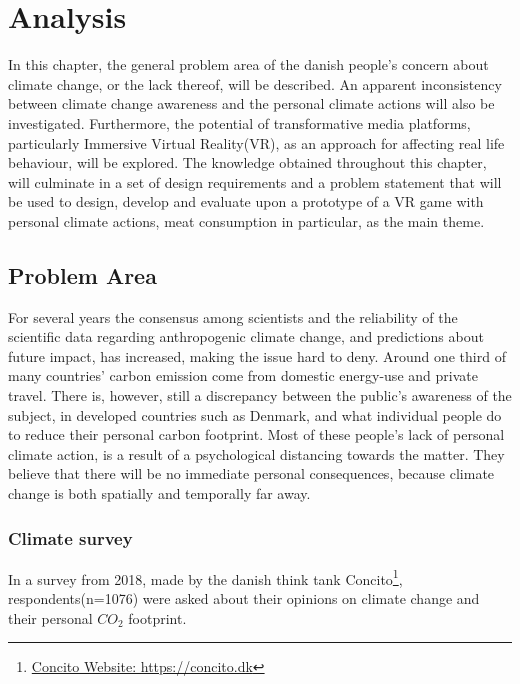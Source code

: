 \chapter{Analysis}\label{chap:analysis}
    In this chapter, the general problem area of the danish people's concern about climate change, or the lack thereof, will be described. An apparent inconsistency between climate change awareness and the personal climate actions will also be investigated. Furthermore, the potential of transformative media platforms, particularly Immersive Virtual Reality(VR), as an approach for affecting real life behaviour, will be explored. The knowledge obtained throughout this chapter, will culminate in a set of design requirements and a problem statement that will be used to design, develop and evaluate upon a prototype of a VR game with personal climate actions, meat consumption in particular, as the main theme.

\section{Problem Area}\label{sec:problemArea}
    For several years the consensus among scientists and the reliability of the scientific data regarding anthropogenic climate change, and predictions about future impact, has increased, making the issue hard to deny\cite{the5Ds, scientistConsensus, publicEngagementUnderstanding}. Around one third of many countries' carbon emission come from domestic energy-use and private travel\cite{reorientingClimageChangeCommunication}. There is, however, still a discrepancy between the public's awareness of the subject, in developed countries such as Denmark, and what individual people do to reduce their personal carbon footprint. Most of these people's lack of personal climate action, is a result of a psychological distancing towards the matter\cite{the5Ds, publicEngagementUnderstanding}. They believe that there will be no immediate personal consequences, because climate change is both spatially and temporally far away\cite{publicEngagementUnderstanding}.
    
    \subsection{Climate survey}
        In a survey from 2018, made by the danish think tank Concito\footnote{\href{https://concito.dk}{Concito Website: https://concito.dk}}, respondents(n=1076) were asked about their opinions on climate change and their personal ${CO_2}$ footprint.
        
